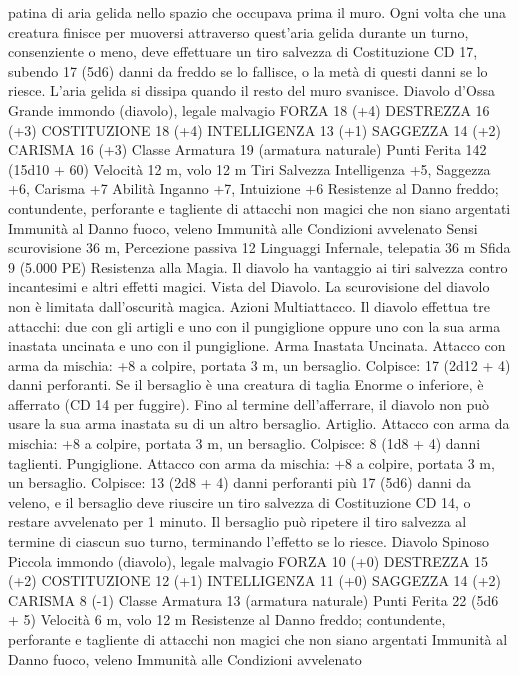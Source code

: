 \begin{multicols}{2}
patina di aria gelida nello spazio che occupava prima il muro.
Ogni volta che una creatura finisce per muoversi attraverso
quest’aria gelida durante un turno, consenziente o meno, deve
effettuare un tiro salvezza di Costituzione CD 17, subendo 17
(5d6) danni da freddo se lo fallisce, o la metà di questi danni se
lo riesce. L’aria gelida si dissipa quando il resto del muro
svanisce.
Diavolo d’Ossa
Grande immondo (diavolo), legale malvagio
FORZA 18 (+4)
DESTREZZA 16 (+3)
COSTITUZIONE 18 (+4)
INTELLIGENZA 13 (+1)
SAGGEZZA 14 (+2)
CARISMA 16 (+3)
Classe Armatura 19 (armatura naturale)
Punti Ferita 142 (15d10 + 60)
Velocità 12 m, volo 12 m
Tiri Salvezza Intelligenza +5, Saggezza +6, Carisma +7
Abilità Inganno +7, Intuizione +6
Resistenze al Danno freddo; contundente, perforante e tagliente
di attacchi non magici che non siano argentati
Immunità al Danno fuoco, veleno
Immunità alle Condizioni avvelenato
Sensi scurovisione 36 m, Percezione passiva 12
Linguaggi Infernale, telepatia 36 m
Sfida 9 (5.000 PE)
Resistenza alla Magia. Il diavolo ha vantaggio ai tiri salvezza
contro incantesimi e altri effetti magici.
Vista del Diavolo. La scurovisione del diavolo non è limitata
dall’oscurità magica.
Azioni
Multiattacco. Il diavolo effettua tre attacchi: due con gli artigli e
uno con il pungiglione oppure uno con la sua arma inastata
uncinata e uno con il pungiglione.
Arma Inastata Uncinata. Attacco con arma da mischia: +8 a
colpire, portata 3 m, un bersaglio.
Colpisce: 17 (2d12 + 4) danni perforanti. Se il bersaglio è una
creatura di taglia Enorme o inferiore, è afferrato (CD 14 per
fuggire). Fino al termine dell’afferrare, il diavolo non può usare
la sua arma inastata su di un altro bersaglio.
Artiglio. Attacco con arma da mischia: +8 a colpire, portata 3 m,
un bersaglio.
Colpisce: 8 (1d8 + 4) danni taglienti.
Pungiglione. Attacco con arma da mischia: +8 a colpire, portata
3 m, un bersaglio.
Colpisce: 13 (2d8 + 4) danni perforanti più 17 (5d6) danni da
veleno, e il bersaglio deve riuscire un tiro salvezza di
Costituzione CD 14, o restare avvelenato per 1 minuto. Il
bersaglio può ripetere il tiro salvezza al termine di ciascun suo
turno, terminando l’effetto se lo riesce.
Diavolo Spinoso
Piccola immondo (diavolo), legale malvagio
FORZA 10 (+0)
DESTREZZA 15 (+2)
COSTITUZIONE 12 (+1)
INTELLIGENZA 11 (+0)
SAGGEZZA 14 (+2)
CARISMA 8 (-1)
Classe Armatura 13 (armatura naturale)
Punti Ferita 22 (5d6 + 5)
Velocità 6 m, volo 12 m
Resistenze al Danno freddo; contundente, perforante e tagliente
di attacchi non magici che non siano argentati
Immunità al Danno fuoco, veleno
Immunità alle Condizioni avvelenato

\end{multicols}
